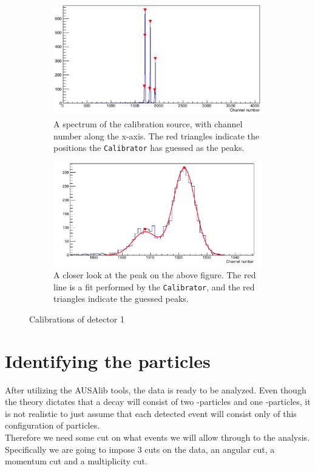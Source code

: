\begin{figure}[H]
	\begin{subfigure}{\linewidth}
		\centering
		\includegraphics[width=.9\linewidth]{../figures/cali/det1f1-cropped-Mia.pdf}
		\caption{A spectrum of the calibration source, with channel number along the x-axis. The red triangles indicate the positions the \texttt{Calibrator} has guessed as the peaks.}
		\label{fig:singleStripExample}
	\end{subfigure}
	\begin{subfigure}{\textwidth}
		\centering
		\includegraphics[width=.9\linewidth]{../figures/cali/det1f1PeakMostLeft-cropped}
		\caption{A closer look at the  peak on the above figure. The red line is a fit performed by the \texttt{Calibrator}, and the red triangles indicate the guessed peaks. }
		\label{fig:peakExample}
	\end{subfigure}
	\caption{Calibrations of detector 1}
	\label{fig:CaliExamples}
\end{figure}


\section{Identifying the particles}
After utilizing the AUSAlib tools, the data is ready to be analyzed. Even though the theory dictates that a decay will consist of two \al-particles and one \be-particles, it is not realistic to just assume that each detected event will consist only of this configuration of particles. \\
Therefore we need some cut on what events we will allow through to the analysis. Specifically we are going to impose 3 cuts on the data, an angular cut, a momentum cut and a multiplicity cut.



